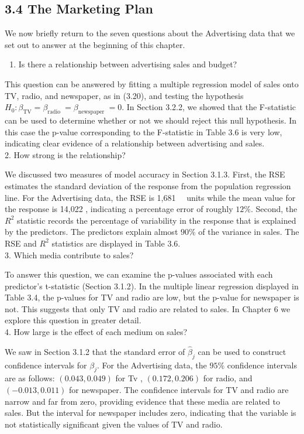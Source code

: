 \documentclass[10pt]{article}
\begin{document}
\subsection*{3.4 The Marketing Plan}
We now briefly return to the seven questions about the Advertising data that we set out to answer at the beginning of this chapter.

\begin{enumerate}
  \item Is there a relationship between advertising sales and budget?
\end{enumerate}

This question can be answered by fitting a multiple regression model of sales onto TV, radio, and newspaper, as in (3.20), and testing the hypothesis $H_{0}: \beta_{\mathrm{TV}}=\beta_{\text {radio }}=\beta_{\text {newspaper }}=0$. In Section 3.2.2, we showed that the F-statistic can be used to determine whether or not we should reject this null hypothesis. In this case the p-value corresponding to the F-statistic in Table 3.6 is very low, indicating clear evidence of a relationship between advertising and sales.\\
2. How strong is the relationship?

We discussed two measures of model accuracy in Section 3.1.3. First, the RSE estimates the standard deviation of the response from the population regression line. For the Advertising data, the RSE is 1,681\
\
units while the mean value for the response is 14,022 , indicating a percentage error of roughly $12 \%$. Second, the $R^{2}$ statistic records the percentage of variability in the response that is explained by the predictors. The predictors explain almost $90 \%$ of the variance in sales. The RSE and $R^{2}$ statistics are displayed in Table 3.6.\\
3. Which media contribute to sales?

To answer this question, we can examine the p-values associated with each predictor's t-statistic (Section 3.1.2). In the multiple linear regression displayed in Table 3.4, the p-values for TV and radio are low, but the p-value for newspaper is not. This suggests that only TV and radio are related to sales. In Chapter 6 we explore this question in greater detail.\\
4. How large is the effect of each medium on sales?

We saw in Section 3.1.2 that the standard error of $\hat{\beta}_{j}$ can be used to construct confidence intervals for $\beta_{j}$. For the Advertising data, the $95 \%$ confidence intervals are as follows: $(0.043,0.049)$ for Tv , $(0.172,0.206)$ for radio, and $(-0.013,0.011)$ for newspaper. The confidence intervals for TV and radio are narrow and far from zero, providing evidence that these media are related to sales. But the interval for newspaper includes zero, indicating that the variable is not statistically significant given the values of TV and radio.
\end{document}
